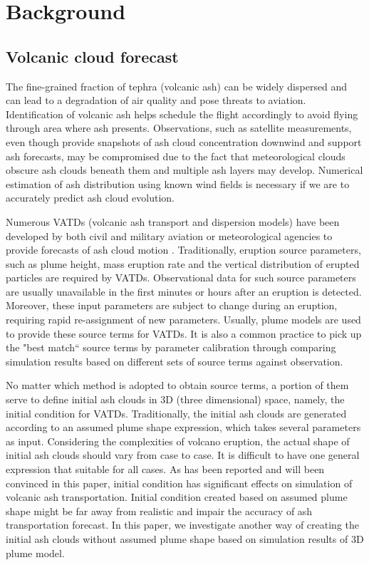 \section{Background}

\subsection{Volcanic cloud forecast}

The fine-grained fraction of tephra (volcanic ash) can be widely dispersed and can lead to a degradation of air quality and pose threats to aviation. Identification of volcanic ash helps schedule the flight accordingly to avoid flying through area where ash presents. Observations, such as satellite measurements, even though provide snapshots of ash cloud concentration downwind and support ash forecasts, may be compromised due to the fact that meteorological clouds obscure ash clouds beneath them and multiple ash layers may develop. Numerical estimation of ash distribution using known wind fields is necessary if we are to accurately predict ash cloud evolution.

Numerous VATDs (volcanic ash transport and dispersion models) have been developed by both civil and military aviation or meteorological agencies to provide forecasts of ash cloud motion \citep{witham2007comparison}. Traditionally, eruption source parameters, such as plume height, mass eruption rate and the vertical distribution of erupted particles are required by VATDs. Observational data for such source parameters are usually unavailable in the first minutes or hours after an eruption is detected. Moreover, these input parameters are subject to change during an eruption, requiring rapid re-assignment of new parameters. Usually, plume models are used to provide these source terms for VATDs. It is also a common practice to pick up the "best match`` source terms by parameter calibration through comparing simulation results based on different sets of source terms against observation. 

No matter which method is adopted to obtain source terms, a portion of them serve to define initial ash clouds in 3D (three dimensional) space, namely, the initial condition for VATDs. Traditionally, the initial ash clouds are generated according to an assumed plume shape expression, which takes several parameters as input. Considering the complexities of volcano eruption, the actual shape of initial ash clouds should vary from case to case. It is difficult to have one general expression that suitable for all cases. As has been reported and will been convinced in this paper, initial condition has significant effects on simulation of volcanic ash transportation. Initial condition created based on assumed plume shape might be far away from realistic and impair the accuracy of ash transportation forecast. In this paper, we investigate another way of creating the initial ash clouds without assumed plume shape based on simulation results of 3D plume model.

